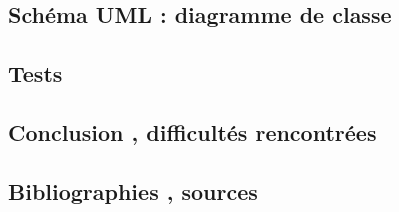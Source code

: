 \documentclass{article}
\begin{document}
\newpage
\begin{center}
	\section{Schéma UML : diagramme de classe}
\end{center}

\newpage
\begin{center}
	\section{Tests}
\end{center}

\newpage
\begin{center}
	\section{Conclusion , difficultés rencontrées}
\end{center}

\newpage
\begin{center}
	\section{Bibliographies , sources}
\end{center}
\end{document}
